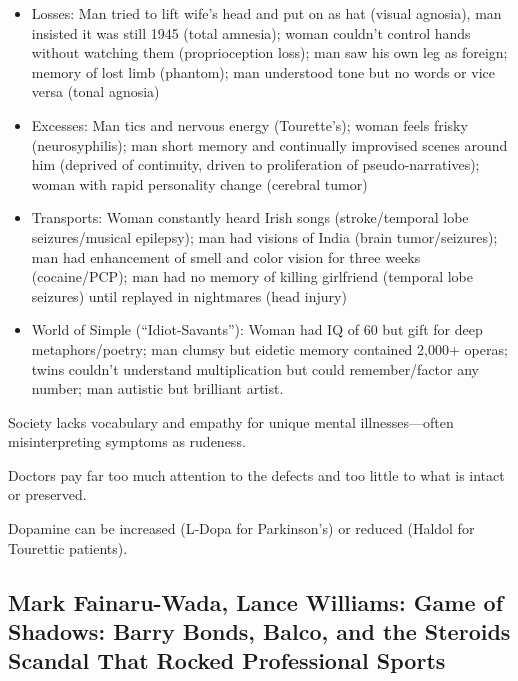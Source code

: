\documentclass[
]{article}
\begin{document}
\begin{itemize}
\item
  Losses: Man tried to lift wife's head and put on as hat (visual
  agnosia), man insisted it was still 1945 (total amnesia); woman
  couldn't control hands without watching them (proprioception loss);
  man saw his own leg as foreign; memory of lost limb (phantom); man
  understood tone but no words or vice versa (tonal agnosia)
\item
  Excesses: Man tics and nervous energy (Tourette's); woman feels frisky
  (neurosyphilis); man short memory and continually improvised scenes
  around him (deprived of continuity, driven to proliferation of
  pseudo-narratives); woman with rapid personality change (cerebral
  tumor)
\item
  Transports: Woman constantly heard Irish songs (stroke/temporal lobe
  seizures/musical epilepsy); man had visions of India (brain
  tumor/seizures); man had enhancement of smell and color vision for
  three weeks (cocaine/PCP); man had no memory of killing girlfriend
  (temporal lobe seizures) until replayed in nightmares (head injury)
\item
  World of Simple (``Idiot-Savants''): Woman had IQ of 60 but gift for
  deep metaphors/poetry; man clumsy but eidetic memory contained 2,000+
  operas; twins couldn't understand multiplication but could
  remember/factor any number; man autistic but brilliant artist.
\end{itemize}

Society lacks vocabulary and empathy for unique mental illnesses---often
misinterpreting symptoms as rudeness.

Doctors pay far too much attention to the defects and too little to what
is intact or preserved.

Dopamine can be increased (L-Dopa for Parkinson's) or reduced (Haldol
for Tourettic patients).

\hypertarget{mark-fainaru-wada-lance-williams-game-of-shadows-barry-bonds-balco-and-the-steroids-scandal-that-rocked-professional-sports}{%
\subsection{Mark Fainaru-Wada, Lance Williams: Game of Shadows: Barry
Bonds, Balco, and the Steroids Scandal That Rocked Professional
Sports}\label{mark-fainaru-wada-lance-williams-game-of-shadows-barry-bonds-balco-and-the-steroids-scandal-that-rocked-professional-sports}}
\end{document}
